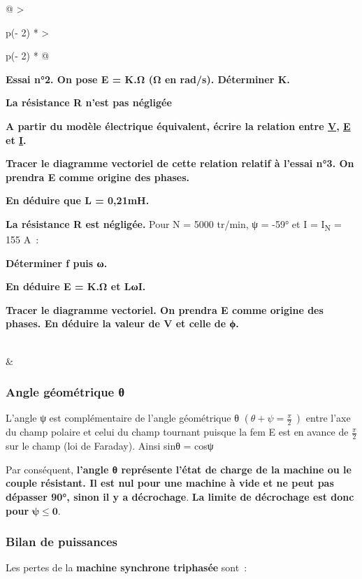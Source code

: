 \begin{longtable}[]{@{}
  >{\raggedright\arraybackslash}p{(\columnwidth - 2\tabcolsep) * }
  >{\raggedright\arraybackslash}p{(\columnwidth - 2\tabcolsep) * }@{}}
\begin{minipage}[b]{\linewidth}
\textbf{Essai n°2. On pose E = K.Ω (Ω en rad/s). Déterminer K.}

\textbf{La résistance R n'est pas négligée}

\textbf{A partir du modèle électrique équivalent, écrire la relation entre \ul{V}, \ul{E} et \ul{I}.}

\textbf{Tracer le diagramme vectoriel de cette relation relatif à l'essai n°3. On prendra E comme origine des phases.}

\textbf{En déduire que L = 0,21mH.}

\textbf{La résistance R est négligée.} Pour N = 5000 tr/min, ψ = -59° et I = I\textsubscript{N} = 155 A~:

\textbf{Déterminer f puis ω.}

\textbf{En déduire E = K.Ω et LωI.}

\textbf{Tracer le diagramme vectoriel. On prendra E comme origine des phases. En déduire la valeur de V et celle de ϕ.}
\end{minipage} \\
\midrule\noalign{}
\endhead
\bottomrule\noalign{}
\endlastfoot
& \\
\end{longtable}

\hypertarget{angle-guxe9omuxe9trique-ux3b8}{%
\subsubsection{Angle géométrique θ}\label{angle-guxe9omuxe9trique-ux3b8}}

L'angle ψ est complémentaire de l'angle géométrique θ \((\theta + \psi = \frac{\pi}{2}\ )\) entre l'axe du champ polaire et celui du champ tournant puisque la fem E est en avance de \(\frac{\pi}{2}\) sur le champ (loi de Faraday). Ainsi sinθ = cosψ

Par conséquent, \textbf{l'angle θ représente l'état de charge de la machine ou le couple résistant. Il est nul pour une machine à vide et ne peut pas dépasser 90°, sinon il y a décrochage}. \textbf{La limite de décrochage est donc pour} \(\mathbf{\psi}\mathbf{\leq 0.}\)

\hypertarget{bilan-de-puissances}{%
\subsubsection{Bilan de puissances}\label{bilan-de-puissances}}

Les pertes de la \textbf{machine synchrone triphasée} sont~:

